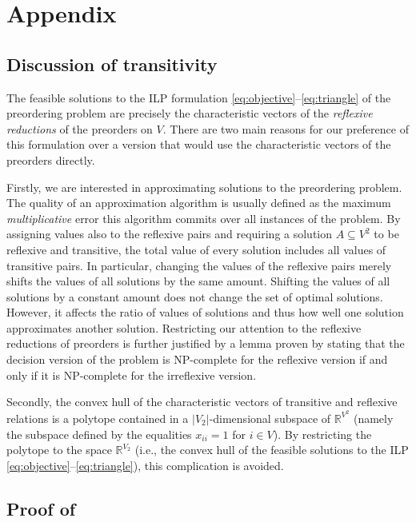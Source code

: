 \appendix
\section{Appendix}

\subsection{Discussion of transitivity} \label{sec:discussion-transitivity}

The feasible solutions to the ILP formulation \eqref{eq:objective}--\eqref{eq:triangle} of the preordering problem are precisely the characteristic vectors of the \emph{reflexive reductions} of the preorders on $V$.
There are two main reasons for our preference of this formulation over a version that would use the characteristic vectors of the preorders directly.

Firstly, we are interested in approximating solutions to the preordering problem.
The quality of an approximation algorithm is usually defined as the maximum \emph{multiplicative} error this algorithm commits over all instances of the problem.
By assigning values also to the reflexive pairs and requiring a solution $A \subseteq V^{2}$ to be reflexive and transitive, the total value of every solution includes all values of transitive pairs.
In particular, changing the values of the reflexive pairs merely shifts the values of all solutions by the same amount.
Shifting the values of all solutions by a constant amount does not change the set of optimal solutions.
However, it affects the ratio of values of solutions and thus how well one solution approximates another solution.
Restricting our attention to the reflexive reductions of preorders is further justified by a lemma proven by \citet{wakabayashi1998complexity} stating that the decision version of the problem is \textsc{NP}-complete for the reflexive version if and only if it is \textsc{NP}-complete for the irreflexive version.

Secondly, the convex hull of the characteristic vectors of transitive and reflexive relations is a polytope contained in a $|V_2|$-dimensional subspace of $\mathbb{R}^{V^2}$ (namely the subspace defined by the equalities $x_{ii} = 1$ for $i \in V$).
By restricting the polytope to the space $\mathbb{R}^{V_2}$ (i.e., the convex hull of the feasible solutions to the ILP \eqref{eq:objective}--\eqref{eq:triangle}), this complication is avoided.



\subsection{Proof of } \label{sec:proof-np-hard}

